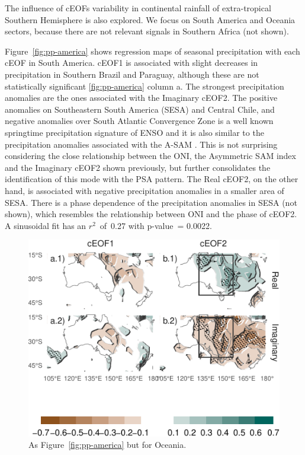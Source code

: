 \documentclass[smallextended]{svjour3}       %
\begin{document}
The influence of cEOFs variability in continental rainfall of extra-tropical Southern Hemisphere is also explored. We focus on South America and Oceania sectors, because there are not relevant signals in Southern Africa (not shown).

Figure~\ref{fig:pp-america} shows regression maps of seasonal precipitation with each cEOF in South America. cEOF1 is associated with slight decreases in precipitation in Southern Brazil and Paraguay, although these are not statistically significant \ref{fig:pp-america} column a. The strongest precipitation anomalies are the ones associated with the Imaginary cEOF2. The positive anomalies on Southeastern South America (SESA) and Central Chile, and negative anomalies over South Atlantic Convergence Zone is a well known springtime precipitation signature of ENSO \citep{cai2020a} and it is also similar to the precipitation anomalies associated with the A-SAM \citep{campitelli2021}. This is not surprising considering the close relationship between the ONI, the Asymmetric SAM index and the Imaginary cEOF2 shown previously, but further consolidates the identification of this mode with the PSA pattern. The Real cEOF2, on the other hand, is associated with negative precipitation anomalies in a smaller area of SESA. There is a phase dependence of the precipitation anomalies in SESA (not shown), which resembles the relationship between ONI and the phase of cEOF2. A sinusoidal fit has an \(r^2\)~of~0.27 with p-value~= 0.0022.



\begin{figure}
\centering
\includegraphics{../figures/pp-oceania-1.pdf}
\caption{\label{fig:pp-oceania}As Figure~\ref{fig:pp-america} but for Oceania.}
\end{figure}
\end{document}
